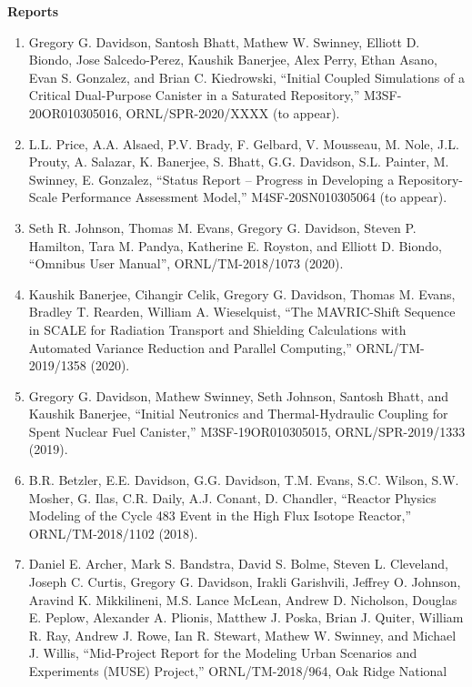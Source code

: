 \documentclass[letterpaper,11pt]{article}
\newcommand{\leftsubheading}[1]{
  \textbf{#1\vspace{-6pt} \\}}
\begin{document}
\leftsubheading{Reports}
\begin{enumerate}
  \item Gregory G. Davidson, Santosh Bhatt, Mathew W. Swinney, Elliott
    D. Biondo, Jose Salcedo-Perez, Kaushik Banerjee, Alex Perry, Ethan
    Asano, Evan S. Gonzalez, and Brian C. Kiedrowski, ``Initial
    Coupled Simulations of a Critical Dual-Purpose Canister in a
    Saturated Repository,'' M3SF-20OR010305016, ORNL/SPR-2020/XXXX (to
    appear).
  \item L.L. Price, A.A. Alsaed, P.V. Brady, F. Gelbard, V. Mousseau,
    M. Nole, J.L. Prouty, A. Salazar, K. Banerjee, S. Bhatt,
    G.G. Davidson, S.L. Painter, M. Swinney, E. Gonzalez, ``Status
    Report -- Progress in Developing a Repository-Scale Performance
    Assessment Model,'' M4SF-20SN010305064 (to appear).
  \item Seth R. Johnson, Thomas M. Evans, Gregory G. Davidson, Steven
    P. Hamilton, Tara M. Pandya, Katherine E. Royston, and Elliott
    D. Biondo, ``Omnibus User Manual'', ORNL/TM-2018/1073 (2020).
  \item Kaushik Banerjee, Cihangir Celik, Gregory G. Davidson,
    Thomas M. Evans, Bradley T. Rearden, William A. Wieselquist,
    ``The MAVRIC-Shift Sequence in SCALE for Radiation Transport and
    Shielding Calculations with Automated Variance Reduction and
    Parallel Computing,'' ORNL/TM-2019/1358 (2020).
  \item Gregory G. Davidson, Mathew Swinney, Seth Johnson, Santosh
    Bhatt, and Kaushik Banerjee, ``Initial Neutronics and
    Thermal-Hydraulic Coupling for Spent Nuclear Fuel Canister,''
    M3SF-19OR010305015, ORNL/SPR-2019/1333 (2019).
  \item B.R. Betzler, E.E. Davidson, G.G. Davidson, T.M. Evans,
    S.C. Wilson, S.W. Mosher, G. Ilas, C.R. Daily, A.J. Conant,
    D. Chandler, ``Reactor Physics Modeling of the Cycle 483 Event
    in the High Flux Isotope Reactor,'' ORNL/TM-2018/1102 (2018).
  \item Daniel E. Archer, Mark S. Bandstra, David S. Bolme, Steven
    L. Cleveland, Joseph C. Curtis, Gregory G. Davidson, Irakli
    Garishvili, Jeffrey O. Johnson, Aravind K. Mikkilineni, M.S. Lance
    McLean, Andrew D. Nicholson, Douglas E. Peplow, Alexander
    A. Plionis, Matthew J. Poska, Brian J. Quiter, William R. Ray,
    Andrew J. Rowe, Ian R. Stewart, Mathew W. Swinney, and Michael
    J. Willis, ``Mid-Project Report for the Modeling Urban Scenarios and
    Experiments (MUSE) Project,'' ORNL/TM-2018/964, Oak Ridge National

\end{enumerate}
\end{document}
